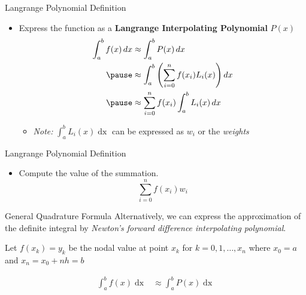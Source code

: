 \documentclass{beamer}
\begin{document}
\begin{frame}{Langrange Polynomial Definition}
    \begin{itemize}
        \item Express the function as a \textbf{Langrange Interpolating Polynomial} $P(x)$ \pause
       \begin{equation}
        \begin{aligned}
          \int_{a}^{b} f(x) \mathop{dx} &\approx \int_{a}^{b} P(x) \mathop{dx} \\ \pause
          &\approx \int_{a}^{b} \left(\sum_{i=0}^{n} f(x_i) L_i(x)\right) \mathop{dx} \\ \pause
          &\approx \sum_{i=0}^{n} f(x_i) \int_{a}^{b} L_i(x) \mathop{dx}
        \end{aligned}        
       \end{equation} \pause
       \begin{itemize}
         \item \textit{Note:} $\int_{a}^{b} L_i(x) \mathop{dx}$ can be expressed as $w_i$ or the \textit{weights}
       \end{itemize}
    \end{itemize}
\end{frame}

\begin{frame}{Langrange Polynomial Definition}
    \begin{itemize}
      \item Compute the value of the summation.
      \begin{equation} 
        \sum_{i=0}^{n} f(x_i) w_i
      \end{equation}
    \end{itemize}
\end{frame}

\begin{frame}{General Quadrature Formula \cite{general_quadrature}}
  Alternatively, we can express the approximation of the definite integral by \textit{Newton's forward difference interpolating polynomial}. \pause

  Let $f(x_k) = y_k$ be the nodal value at point $x_k$ for $k = 0,1,\dots,x_n$ where $x_0 = a$ and $x_n = x_0 + nh = b$ \pause 

      \begin{equation*}
        \begin{aligned}
          \int_{a}^{b} f(x) \mathop{dx} &\approx \int_a^b P(x) \mathop{dx}
        \end{aligned}
      \end{equation*}
\end{frame}
\end{document}

